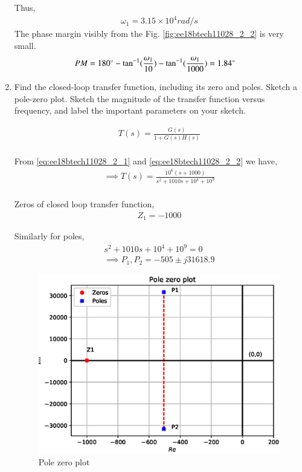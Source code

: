 \begin{enumerate}[label=\arabic*.,ref=\theenumi]
Thus, 
\begin{align}
     \omega_{1} = 3.15 \times 10^{4} rad/s
\end{align}
The phase margin visibly from the Fig. \ref{fig:ee18btech11028_2_2} is very small.
\begin{align}
    PM = 180 \degree - \tan^{-1}(\frac{\omega_{1}}{10}) - \tan^{-1}(\frac{\omega_{1}}{1000})
      & = 1.84 \degree
\end{align}

\item Find the closed-loop transfer function, including its zero
and poles. Sketch a pole-zero plot. Sketch the magnitude of
the transfer function versus frequency, and label the important parameters on your sketch.
\\ 
\solution

\begin{align}
    T(s) = \frac{G(s)}{1 + G(s)H(s)}
    \\
\end{align}

From \eqref{eq:ee18btech11028_2_1} and \eqref{eq:ee18btech11028_2_2} we have,
\begin{align}
    \implies T(s) = \frac{10^{6}(s+1000)}{s^{2} + 1010s + 10^{4} + 10^{9}}
    \\
     \label{eq:ee18btech11028_2_3}
\end{align}

Zeros of closed loop transfer function,
\begin{align}
    Z_{1} = -1000
\end{align}

Similarly for poles,
\begin{align}
    s^{2} + 1010s + 10^{4} + 10^{9} = 0
    \\
    \implies P_{1}, P_{2} = -505 \pm j31618.9
\end{align}

\begin{figure}[!ht]
    \centering
    \includegraphics[width=\columnwidth]{./figs/ee18btech11028/fig_3.eps}
    \caption{Pole zero plot}
    \label{fig:ee18btech11028_2_3}
\end{figure}



\end{enumerate}
